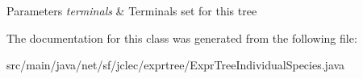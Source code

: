 \begin{DoxyParams}{Parameters}
{\em terminals} & Terminals set for this tree \\
\hline
\end{DoxyParams}


The documentation for this class was generated from the following file\-:\begin{DoxyCompactItemize}
\item 
src/main/java/net/sf/jclec/exprtree/Expr\-Tree\-Individual\-Species.\-java\end{DoxyCompactItemize}
